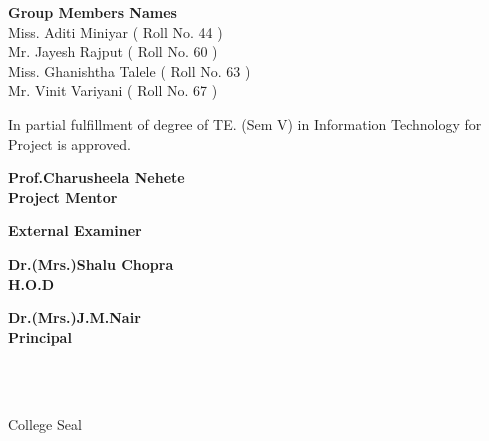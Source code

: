 \documentclass[a4paper, 12pt]{report}
\begin{document}
\begin{frontmatter}
\begin{titlepage}
\begin{center}
\textbf{Group Members Names}\\
Miss. Aditi Miniyar ( Roll No. 44 ) \\
Mr. Jayesh Rajput ( Roll No. 60 ) \\
Miss. Ghanishtha Talele  ( Roll No. 63 ) \\
Mr. Vinit Variyani ( Roll No. 67 ) \\
\end{center} 
In partial fulfillment of degree of TE. (Sem V) in Information Technology for  Project is approved.
\vspace{2cm}
\begin{multicols}{2}
\begin{center}
\textbf{Prof.Charusheela Nehete \\Project Mentor}\hspace{8cm}\\
\end{center}
\begin{center}
\textbf{External Examiner}\hspace{8cm}\\
\end{center}
\end{multicols}
\vspace{0.6cm}
\begin{multicols}{2}
\begin{center}
\textbf{Dr.(Mrs.)Shalu Chopra\\H.O.D}\hspace{8cm}\\
\end{center}
\begin{center}
\textbf{Dr.(Mrs.)J.M.Nair\\ Principal}\\
\end{center}
\end{multicols}
\vfill
\vspace{0.5cm}
\\
\\
\begin{flushright}
College Seal
\end{flushright}

\end{titlepage}



\pagebreak



\end{frontmatter}
\end{document}
